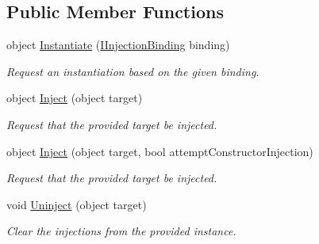 \subsection*{Public Member Functions}
\begin{DoxyCompactItemize}
\item 
object \hyperlink{interfacestrange_1_1extensions_1_1injector_1_1api_1_1_i_injector_ab6c185a183b27708e38c4954195fe591}{Instantiate} (\hyperlink{interfacestrange_1_1extensions_1_1injector_1_1api_1_1_i_injection_binding}{I\-Injection\-Binding} binding)
\begin{DoxyCompactList}\small\item\em Request an instantiation based on the given binding. \end{DoxyCompactList}\item 
\hypertarget{interfacestrange_1_1extensions_1_1injector_1_1api_1_1_i_injector_a3c4b0fc21caebeafe42ad797001181e8}{object \hyperlink{interfacestrange_1_1extensions_1_1injector_1_1api_1_1_i_injector_a3c4b0fc21caebeafe42ad797001181e8}{Inject} (object target)}\label{interfacestrange_1_1extensions_1_1injector_1_1api_1_1_i_injector_a3c4b0fc21caebeafe42ad797001181e8}

\begin{DoxyCompactList}\small\item\em Request that the provided target be injected. \end{DoxyCompactList}\item 
\hypertarget{interfacestrange_1_1extensions_1_1injector_1_1api_1_1_i_injector_a82ddabe54623ed3caed1ad607b679ad1}{object \hyperlink{interfacestrange_1_1extensions_1_1injector_1_1api_1_1_i_injector_a82ddabe54623ed3caed1ad607b679ad1}{Inject} (object target, bool attempt\-Constructor\-Injection)}\label{interfacestrange_1_1extensions_1_1injector_1_1api_1_1_i_injector_a82ddabe54623ed3caed1ad607b679ad1}

\begin{DoxyCompactList}\small\item\em Request that the provided target be injected. \end{DoxyCompactList}\item 
void \hyperlink{interfacestrange_1_1extensions_1_1injector_1_1api_1_1_i_injector_a97ed5ca85ac9043a53ae49122a5dc3ca}{Uninject} (object target)
\begin{DoxyCompactList}\small\item\em Clear the injections from the provided instance. \end{DoxyCompactList}\end{DoxyCompactItemize}

